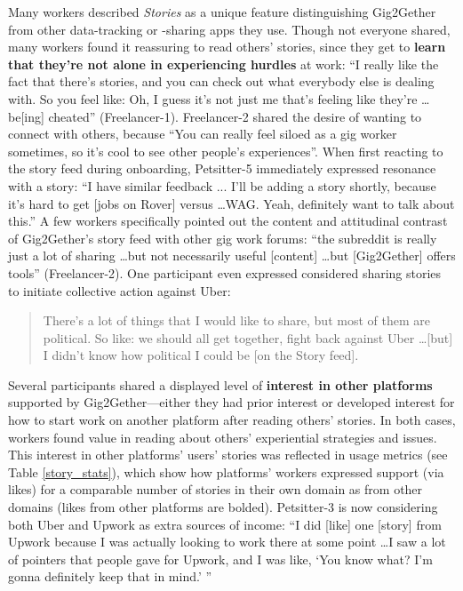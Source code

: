 Many workers described \textit{Stories} as a unique feature distinguishing Gig2Gether from other data-tracking or -sharing apps they use. Though not everyone shared, many workers found it reassuring to read others' stories, since they get to \textbf{learn that they're not alone in experiencing hurdles} at work: ``I really like the fact that there's stories, and you can check out what everybody else is dealing with. So you feel like: Oh, I guess it's not just me that's feeling like they're \dots be[ing] cheated'' (Freelancer-1). Freelancer-2 shared the desire of wanting to connect with others, because ``You can really feel siloed as a gig worker sometimes, so it's cool to see other people's experiences''. When first reacting to the story feed during onboarding, Petsitter-5 immediately expressed resonance with a story: ``I have similar feedback ... I'll be adding a story shortly, because it's hard to get [jobs on Rover] versus \dots WAG. Yeah, definitely want to talk about this.''
A few workers specifically pointed out the content and attitudinal contrast of Gig2Gether's story feed with other gig work forums: ``the subreddit is really just a lot of sharing \dots but not necessarily useful [content] \dots but [Gig2Gether] offers tools'' (Freelancer-2). One participant even expressed considered sharing stories to initiate collective action against Uber:

\begin{quote}
There's a lot of things that I would like to share, but most of them are political. So like: we should all get together, fight back against Uber \dots [but] I didn't know how political I could be [on the Story feed].
\end{quote}

Several participants shared a displayed level of \textbf{interest in other platforms} supported by {Gig2Gether}---either they had prior interest or developed interest for how to start work on another platform after reading others' stories. In both cases, workers found value in reading about others' experiential strategies and issues. {This interest in other platforms' users' stories was reflected in usage metrics (see Table \ref{story_stats}), which show how platforms' workers expressed support (via likes) for a comparable number of stories in their own domain as from other domains (likes from other platforms are bolded).} Petsitter-3 is now considering both Uber and Upwork as extra sources of income: ``I did [like] one [story] from Upwork because I was actually looking to work there at some point \dots I saw a lot of pointers that people gave for Upwork, and I was like, `You know what? I'm gonna definitely keep that in mind.' '' 


